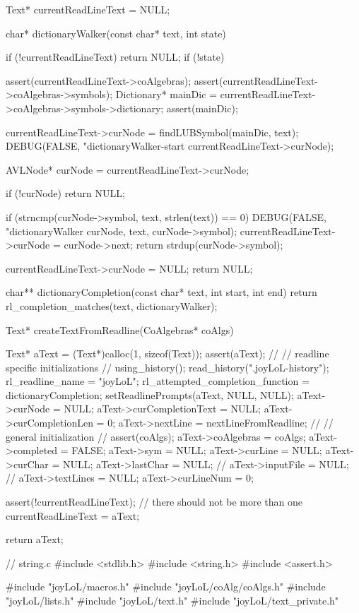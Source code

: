 Text* currentReadLineText = NULL;

char* dictionaryWalker(const char* text, int state) {
  if (!currentReadLineText) return NULL;
  if (!state) {

    assert(currentReadLineText->coAlgebras);
    assert(currentReadLineText->coAlgebras->symbols);
    Dictionary* mainDic =
      currentReadLineText->coAlgebras->symbols->dictionary;
    assert(mainDic);

    currentReadLineText->curNode = findLUBSymbol(mainDic, text);
    DEBUG(FALSE, "dictionaryWalker-start %
          currentReadLineText->curNode);
  }
  AVLNode* curNode = currentReadLineText->curNode;

  if (!curNode) return NULL;

  if (strncmp(curNode->symbol, text, strlen(text)) == 0) {
    DEBUG(FALSE, "dictionaryWalker %
          curNode, text, curNode->symbol);
    currentReadLineText->curNode = curNode->next;
    return strdup(curNode->symbol);
  }

  currentReadLineText->curNode = NULL;
  return NULL;
}

char** dictionaryCompletion(const char* text, int start, int end) {
 return rl_completion_matches(text, dictionaryWalker);
}

Text* createTextFromReadline(CoAlgebras* coAlgs) {
  Text* aText = (Text*)calloc(1, sizeof(Text));
  assert(aText);
  //
  // readline specific initializations
  //
  using_history();
  read_history(".joyLoL-history");
  rl_readline_name = "joyLoL";
  rl_attempted_completion_function = dictionaryCompletion;
  setReadlinePrompts(aText, NULL, NULL);
  aText->curNode = NULL;
  aText->curCompletionText = NULL;
  aText->curCompletionLen  = 0;
  aText->nextLine = nextLineFromReadline;
  //
  // general initialization
  //
  assert(coAlgs);
  aText->coAlgebras = coAlgs;
  aText->completed  = FALSE;
  aText->sym        = NULL;
  aText->curLine    = NULL;
  aText->curChar    = NULL;
  aText->lastChar   = NULL;
  //
  aText->inputFile = NULL;
  //
  aText->textLines  = NULL;
  aText->curLineNum = 0;

  assert(!currentReadLineText); // there should not be more than one
  currentReadLineText = aText;

  return aText;
}
\stoptyping

\starttyping
// string.c
#include <stdlib.h>
#include <string.h>
#include <assert.h>

#include "joyLoL/macros.h"
#include "joyLoL/coAlg/coAlgs.h"
#include "joyLoL/lists.h"
#include "joyLoL/text.h"
#include "joyLoL/text_private.h"

